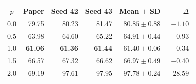 \begingroup
\setlength{\tabcolsep}{4pt}
\begin{tabular}{@{}crrrrr@{}}
\hline
$p$ & Paper & Seed 42 & Seed 43 & Mean $\pm$ SD & $\Delta$ \\
\hline
0.0 & 79.75 & 80.23 & 81.47 & $80.85 \pm 0.88$ & $-1.10$ \\
0.5 & 63.98 & 64.60 & 65.22 & $64.91 \pm 0.44$ & $-0.93$ \\
1.0 & \textbf{61.06} & \textbf{61.36} & \textbf{61.44} & $\mathbf{61.40} \pm 0.06$ & $-0.34$ \\
1.5 & 66.57 & 67.32 & 66.62 & $66.97 \pm 0.49$ & $-0.40$ \\
2.0 & 69.19 & 97.61 & 97.95 & $97.78 \pm 0.24$ & $-28.59$ \\
\hline
\end{tabular}
\endgroup

